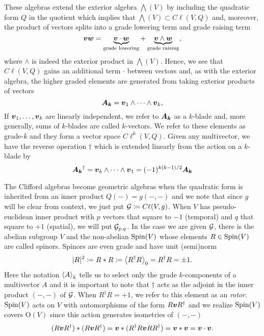 \documentclass{article}
\begin{document}
These algebras extend the exterior algebra $\bigwedge(V)$ by including the quadratic form $Q$ in the quotient which implies that $\bigwedge(V)\subset C\ell(V,Q)$ and, moreover, the product of vectors splits into a grade lowering term and grade raising term
\begin{equation}
    \blade{v}\blade{w}= \underbrace{\blade{v}\cdot \blade{w}}_{\textrm{grade lowering}} +\underbrace{\blade{v}\wedge \blade{w}}_{\textrm{grade raising}},
\end{equation}
where $\wedge$ is indeed the exterior product in $\bigwedge(V)$. Hence, we see that $C\ell(V,Q)$ gains an additional term $\cdot$ between vectors and, as with the exterior algebra, the higher graded elements are generated from taking exterior products of vectors
\begin{equation}
    \blade{A_k} = \blade{v}_1 \wedge \cdots \wedge \blade{v}_k,
\end{equation}
If $\blade{v}_1,\dots,\blade{v}_k$ are linearly independent, we refer to $\blade{A_k}$ as a $k$-blade and, more generally, sums of $k$-blades are called $k$-vectors. We refer to these elements as grade-$k$ and they form a vector space $C\ell^k(V,Q)$. Given any multivector, we have the reverse operation $\dagger$ which is extended linearly from the action on a $k$-blade by
\begin{equation}
    \blade{A_k}^\dagger = \blade{v}_k\wedge \cdots \wedge \blade{v}_1 = (-1)^{k(k-1)/2} \blade{A_k}
\end{equation}

The Clifford algebras become geometric algebras when the quadratic form is inherited from an inner product $Q(-)=g(-,-)$ and we note that since $g$ will be clear from context, we just put $\G\coloneqq C\ell(V,g)$. When $V$ has pseudo-euclidean inner product with $p$ vectors that square to $-1$ (temporal) and $q$ that square to $+1$ (spatial), we will put $\G_{p,q}$. In the case we are given $\G$, there is the abelian subgroup $V$ and the non-abelian $\sping(V)$ whose elements $R\in \sping(V)$ are called spinors. Spinors are even grade and have unit (semi)norm
\begin{equation}
|R|^2 \coloneqq R \ast R \coloneqq \proj{0}{R^\dagger R}= R^\dagger R = \pm 1.
\end{equation}
Here the notation $\proj{k}{A}$ tells us to select only the grade $k$-components of a multivector $A$ and it is important to note that $\dagger$ acts as the adjoint in the inner product $(-,-)$ of $\G$. When $R^\dagger R = +1$, we refer to this element as an \emph{rotor}. $\sping(V)$ acts on $V$ with automorphisms of the form $R \blade{v} R^\dagger$ and we realize $\sping(V)$ covers $\mathrm{O}(V)$ since this action generates isometries of $(-,-)$ 
\begin{equation}
    (R\blade{v}R^\dagger) \ast (R\blade{v}R^\dagger) = \blade{v} \ast (R^\dagger R \blade{v} RR^\dagger) = \blade{v}\ast \blade{v} = \blade{v}\cdot \blade{v}.
\end{equation}
\end{document}
